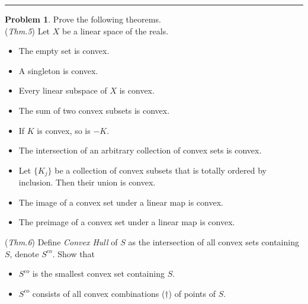 \documentclass[a4paper, 10pt]{article}
\theoremstyle{definition}
\newtheorem{problem}{Problem}
\theoremstyle{hSol}
\begin{document}
\noindent\rule{16cm}{0.4pt}

\begin{problem} Prove the following theorems. \\
(\textit{Thm.5}) Let $X$ be a linear space of the reals.
\begin{itemize}
  \item[1.] The empty set is convex.
  \item[2.] A singleton is convex.
  \item[3.] Every linear subspace of $X$ is convex.
  \item[4.] The sum of two convex subsets is convex.
  \item[5.] If $K$ is convex, so is $-K$.
  \item[6.] The intersection of an arbitrary collection of convex sets is convex.
  \item[7.] Let $\{K_j\}$ be a collection of convex subsets that is totally ordered by inclusion. Then their union is convex.
  \item[8.] The image of a convex set under a linear map is convex.
  \item[9.] The preimage of a convex set under a linear map is convex.
\end{itemize}
(\textit{Thm.6}) Define \textit{Convex Hull} of $S$ as the intersection of all convex sets containing $S$, denote $S^{co}$. Show that
\begin{itemize}
  \item[1.] $S^{co}$ is the smallest convex set containing $S$.
  \item[2.] $S^{co}$ consists of all convex combinations ($\dag$) of points of $S$.
\end{itemize}
\end{problem}
\end{document}

